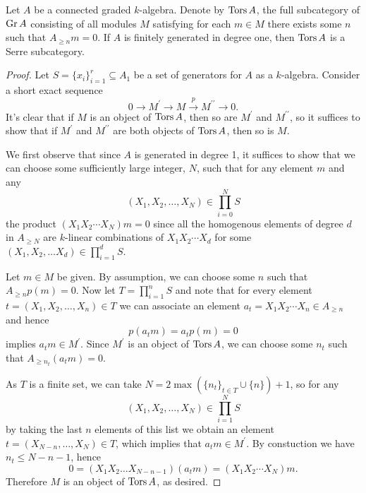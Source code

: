 \begin{proposition}
  Let \(A\) be a connected graded \(k\)-algebra.
  Denote by \(\operatorname{Tors}A\), the full subcategory of \(\operatorname{Gr}A\) consisting of all modules \(M\) satisfying for each \(m \in M\) there exists some \(n\) such that \(A_{\geq n}m = 0\).
  If \(A\) is finitely generated in degree one, then \(\operatorname{Tors}A\) is a Serre subcategory.
\end{proposition}

\begin{proof}
  Let \(S = \{x_i\}_{i = 1}^r \subseteq A_1\) be a set of generators for \(A\) as a \(k\)-algebra.
  Consider a short exact sequence
  \[0 \to M^\prime \to M \overset{p}\to M^{\prime\prime} \to 0.\]
  It's clear that if \(M\) is an object of \(\operatorname{Tors}A\), then so are \(M^\prime\) and \(M^{\prime\prime}\), so it suffices to show that if \(M^\prime\) and \(M^{\prime\prime}\) are both objects of \(\operatorname{Tors}A\), then so is \(M\).

  We first observe that since \(A\) is generated in degree 1, it suffices to show that we can choose some sufficiently large integer, \(N\), such that for any element \(m\) and any
  \[(X_1, X_2, \ldots, X_N) \in \prod_{i = 0}^N S\]
  the product
  \((X_1 X_2 \cdots X_N) m = 0\)
  since all the homogenous elements of degree \(d\) in \(A_{\geq N}\) are \(k\)-linear combinations of \(X_1 X_2 \cdots X_d\) for some \((X_1, X_2, \ldots X_d) \in \prod_{i = 1}^d S\).
 
  Let \(m \in M\) be given.
  By assumption, we can choose some \(n\) such that \(A_{\geq {n}}p(m) = 0\).
  Now let \(T = \prod_{i = 1}^n S\) and note that for every element \(t = (X_1, X_2, \ldots, X_n) \in T\) we can associate an element \(a_t = X_1 X_2 \cdots X_n \in A_{\geq n}\) and hence
  \[p(a_t m) = a_t p(m) = 0\]
  implies \(a_t m \in M^\prime\).
  Since \(M^\prime\) is an object of \(\operatorname{Tors}A\), we can choose some \(n_t\) such that \(A_{\geq n_t} (a_tm) = 0\).

  As \(T\) is a finite set, we can take \(N = 2\max\left(\{n_t\}_{t \in T} \cup \{n\}\right) + 1\), so for any 
  \[(X_1, X_2, \ldots, X_{N}) \in \prod_{i = 1}^{N} S\]
  by taking the last \(n\) elements of this list we obtain an element \(t = (X_{N - n}, \ldots, X_{N})\in T\), which implies that \(a_t m \in M^\prime\).
  By constuction we have \(n_t \leq N - n - 1\), hence
  \[0 = (X_1X_2\ldots X_{N - n - 1})(a_t m) = (X_1 X_2 \cdots X_{N}) m.\]
  Therefore \(M\) is an object of \(\operatorname{Tors}A\), as desired.
\end{proof}

